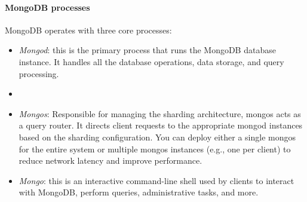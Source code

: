 \paragraph*{MongoDB processes}
MongoDB operates with three core processes:
\begin{itemize}
    \item \textit{Mongod}: this is the primary process that runs the MongoDB database instance. 
        It handles all the database operations, data storage, and query processing.
    \item \item \textit{Mongos}: Responsible for managing the sharding architecture, mongos acts as a query router. 
    It directs client requests to the appropriate mongod instances based on the sharding configuration. 
        You can deploy either a single mongos for the entire system or multiple mongos instances (e.g., one per client) to reduce network latency and improve performance.
    \item \textit{Mongo}: this is an interactive command-line shell used by clients to interact with MongoDB, perform queries, administrative tasks, and more.
\end{itemize}

